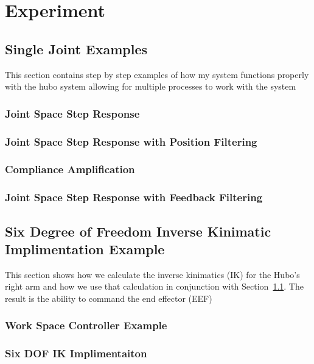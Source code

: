 \chapter{Experiment}
\section{Single Joint Examples}\label{sec:simpleExamples}
This section contains step by step examples of how my system functions properly with the hubo system allowing for multiple processes to work with the system

	\subsection{Joint Space Step Response}\label{sec:singlejointStep}
		
	\subsection{Joint Space Step Response with Position Filtering}\label{sec:singlejointFilter}
		
	\subsection{Compliance Amplification}\label{sec:singlejointRefComplience}
		
	\subsection{Joint Space Step Response with Feedback Filtering}\label{sec:singlejointEnc}
		
\section{Six Degree of Freedom Inverse Kinimatic Implimentation Example}\label{sec:6dofik}
This section shows how we calculate the inverse kinimatics (IK) for the Hubo's right arm and how we use that calculation in conjunction with Section~\ref{sec:simpleExamples}.  The result is the ability to command the end effector (EEF)
	\subsection{Work Space Controller Example}
		
	\subsection{Six DOF IK Implimentaiton}
		
